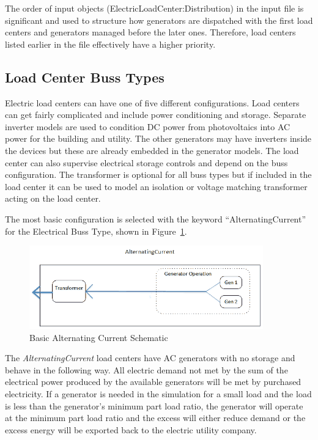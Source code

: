 The order of input objects (ElectricLoadCenter:Distribution) in the input file is significant and used to structure how generators are dispatched with the first load centers and generators managed before the later ones. Therefore, load centers listed earlier in the file effectively have a higher priority.

\subsection{Load Center Buss Types}

Electric load centers can have one of five different configurations. Load centers can get fairly complicated and include power conditioning and storage. Separate inverter models are used to condition DC power from photovoltaics into AC power for the building and utility. The other generators may have inverters inside the devices but these are already embedded in the generator models. The load center can also supervise electrical storage controls and depend on the buss configuration. The transformer is optional for all buss types but if included in the load center it can be used to model an isolation or voltage matching transformer acting on the load center.

The most basic configuration is selected with the keyword “AlternatingCurrent” for the Electrical Buss Type, shown in Figure~\ref{fig:basic-alternating-current-schematic}.

\begin{figure}[hbtp] %
\centering
\includegraphics[width=0.9\textwidth, height=0.9\textheight, keepaspectratio=true]{media/ACBussDiagram.png}
\caption{Basic Alternating Current Schematic \protect \label{fig:basic-alternating-current-schematic}}
\end{figure}

The \emph{AlternatingCurrent} load centers have AC generators with no storage and behave in the following way. All electric demand not met by the sum of the electrical power produced by the available generators will be met by purchased electricity.  If a generator is needed in the simulation for a small load and the load is less than the generator’s minimum part load ratio, the generator will operate at the minimum part load ratio and the excess will either reduce demand or the excess energy will be exported back to the electric utility company. 

